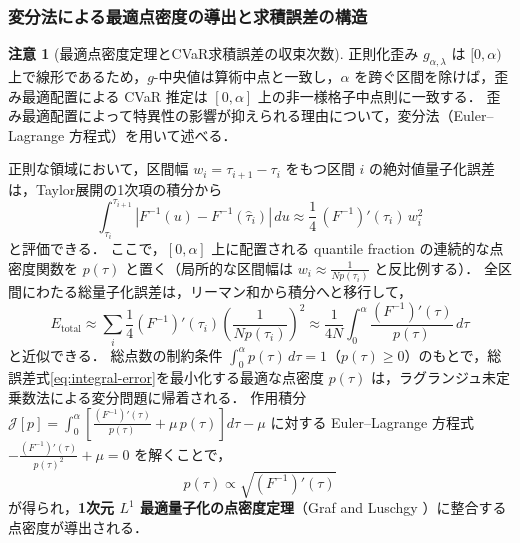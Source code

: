 \documentclass[a4paper,10pt]{jsarticle}
\theoremstyle{definition}
\newtheorem{remark}{注意}[section]
\renewcommand{\Finv}{F^{-1}}
\begin{document}
\subsubsection{変分法による最適点密度の導出と求積誤差の構造}
\begin{remark}[最適点密度定理とCVaR求積誤差の収束次数]
\label{rem:midpoint}
正則化歪み $g_{\alpha,\lambda}$ は $[0,\alpha)$ 上で線形であるため，$g$-中央値は算術中点と一致し，$\alpha$ を跨ぐ区間を除けば，歪み最適配置による CVaR 推定は $[0,\alpha]$ 上の非一様格子中点則に一致する．
歪み最適配置によって特異性の影響が抑えられる理由について，変分法（Euler--Lagrange 方程式）を用いて述べる．

正則な領域において，区間幅 $w_i = \tau_{i+1} - \tau_i$ をもつ区間 $i$ の絶対値量子化誤差は，Taylor展開の1次項の積分から
\begin{equation}
  \int_{\tau_i}^{\tau_{i+1}} |\Finv(u) - \Finv(\hat\tau_i)|\,du \approx \frac{1}{4}\,(\Finv)'(\tau_i)\,w_i^2
\end{equation}
と評価できる．
ここで，$[0, \alpha]$ 上に配置される quantile fraction の連続的な点密度関数を $p(\tau)$ と置く（局所的な区間幅は $w_i \approx \frac{1}{N p(\tau_i)}$ と反比例する）．
全区間にわたる総量子化誤差は，リーマン和から積分へと移行して，
\begin{equation}
  E_{\mathrm{total}} \approx \sum_{i} \frac{1}{4}(\Finv)'(\tau_i)\left(\frac{1}{N p(\tau_i)}\right)^2 \approx \frac{1}{4N}\int_0^\alpha \frac{(\Finv)'(\tau)}{p(\tau)}\,d\tau
  \label{eq:integral-error}
\end{equation}
と近似できる．
総点数の制約条件 $\int_0^\alpha p(\tau)\,d\tau = 1$（$p(\tau) \ge 0$）のもとで，総誤差式\eqref{eq:integral-error}を最小化する最適な点密度 $p(\tau)$ は，ラグランジュ未定乗数法による変分問題に帰着される．
作用積分 $\mathcal{J}[p] = \int_0^\alpha \left[ \frac{(\Finv)'(\tau)}{p(\tau)} + \mu\,p(\tau) \right] d\tau - \mu$ に対する Euler--Lagrange 方程式 $-\frac{(\Finv)'(\tau)}{p(\tau)^2} + \mu = 0$ を解くことで，
\begin{equation}
  p(\tau) \propto \sqrt{(\Finv)'(\tau)}
  \label{eq:density-theorem}
\end{equation}
が得られ，\textbf{1次元 $L^1$ 最適量子化の点密度定理}（Graf and Luschgy \cite{graf2000quantization}）に整合する点密度が導出される．


\end{remark}
\end{document}
